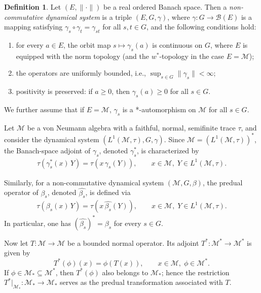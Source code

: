 \documentclass[11pt]{amsart}
\theoremstyle{definition}
\newtheorem{defn}[thm]{Definition}
\theoremstyle{myremark}
\numberwithin{equation}{section}
\newcommand{\CM}{\mathcal{M}}
\begin{document}
\begin{defn}\label{nc dyn sys} Let \((E,\|\cdot\|)\) be a real ordered Banach space.
Then a \emph{non-commutative dynamical system} is a triple \((E,G,\gamma)\), where \(\gamma : G \to \mathcal{B}(E)\) is a mapping satisfying \(\gamma_s \circ \gamma_t = \gamma_{st}\) for all \(s,t \in G\), and the following conditions hold:
\begin{enumerate}
    \item for every \(a \in E\), the orbit map \(s \mapsto \gamma_s(a)\) is continuous on \(G\), where \(E\) is equipped with the norm topology (and the \(w^*\)-topology in the case \(E=\mathcal{M}\));
    \item the operators are uniformly bounded, i.e., \(\sup_{s \in G}\|\gamma_s\| < \infty\);
    \item positivity is preserved: if \(a \ge 0\), then \(\gamma_s(a) \ge 0\) for all \(s\in G\).
    
\end{enumerate}
\end{defn}
\noindent We further assume that if $E = \CM$, $\gamma_{s}$ is a *-automorphism on $\CM$ for all $s \in G$.












\noindent Let \(\mathcal{M}\) be a von Neumann algebra with a faithful, normal, semifinite trace \(\tau\), and consider the dynamical system \((L^{1}(\mathcal{M},\tau), G, \gamma)\). Since \(\mathcal{M} = (L^{1}(\mathcal{M},\tau))^{*}\), the Banach-space adjoint of \(\gamma_s\), denoted \(\gamma_s^{*}\), is characterized by
\begin{align}\label{dual trans}
    \tau(\gamma_s^{*}(x)\, Y) = \tau(x\, \gamma_s(Y)), 
    \qquad x \in \mathcal{M}, \; Y \in L^1(\mathcal{M},\tau).
\end{align}

Similarly, for a non-commutative dynamical system \((\mathcal{M}, G, \beta)\), the predual operator of \(\beta_s\), denoted \(\widehat{\beta_s}\), is defined via
\begin{align}\label{predual trans}
    \tau(\beta_s(x)\, Y) = \tau(x\, \widehat{\beta_s}(Y)),
    \qquad x \in \mathcal{M}, \; Y \in L^{1}(\mathcal{M},\tau).
\end{align}
In particular, one has \((\widehat{\beta_s})^{*} = \beta_s\) for every \(s \in G\).

Now let \(T : \mathcal{M} \to \mathcal{M}\) be a bounded normal operator. Its adjoint \(T^{*} : \mathcal{M}^{*} \to \mathcal{M}^{*}\) is given by
\[
    T^{*}(\phi)(x) = \phi(T(x)), \qquad x \in \mathcal{M},\; \phi \in \mathcal{M}^{*}.
\]
If \(\phi \in \mathcal{M}_{*}\subseteq \mathcal{M}^{*}\), then \(T^{*}(\phi)\) also belongs to \(\mathcal{M}_{*}\); hence the restriction \(T^{*}|_{\mathcal{M}_{*}}\colon \mathcal{M}_{*}\to \mathcal{M}_{*}\) serves as the predual transformation associated with \(T\).
\end{document}
